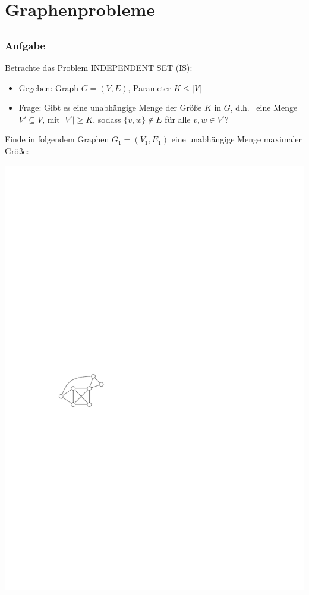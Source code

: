 \section{Graphenprobleme}
\subsection{}

\begin{frame}
\frametitle{Aufgabe}
Betrachte das Problem INDEPENDENT SET (IS):

\begin{itemize}
 \item Gegeben: Graph $G=(V, E)$, Parameter $K \leq |V|$
 \item Frage: Gibt es eine unabhängige Menge der Größe $K$ in $G$, d.h.~ eine Menge $V' \subseteq V$, mit $|V'| \geq K$, sodass $\{v, w\} \notin E$ für alle $v, w \in V'$? 
\end{itemize}

 {

Finde in folgendem Graphen $G_1 = (V_1, E_1)$ eine unabhängige Menge maximaler Größe:

\begin{center}\includegraphics[scale=1.5]{images/tut7-graph}\end{center}

}
\end{frame}
